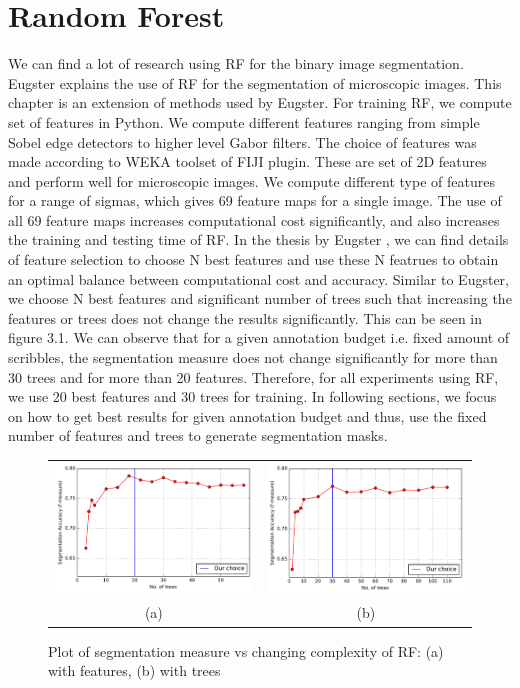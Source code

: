 \section{Random Forest}
We can find a lot of research using RF for the binary image segmentation. Eugster \cite{dominic} explains the use of RF for the segmentation of microscopic images. This chapter is an extension of methods used by Eugster. For training RF, we compute set of features in Python. We compute different features ranging from simple Sobel edge detectors to higher level Gabor filters. The choice of features was made according to WEKA \cite{weka} toolset of FIJI \cite{fiji} plugin. These are set of 2D features and perform well for microscopic images. We compute different type of features for a range of sigmas, which gives 69 feature maps for a single image. The use of all 69 feature maps increases computational cost significantly, and also increases the training and testing time of RF. In the thesis by Eugster \cite{dominic}, we can find details of feature selection to choose N best features and use these N featrues to obtain an optimal balance between computational cost and accuracy. Similar to Eugster, we choose N best features and significant number of trees such that increasing the features or trees does not change the results significantly. This can be seen in figure 3.1. We can observe that for a given annotation budget i.e. fixed amount of scribbles, the segmentation measure does not change significantly for more than 30 trees and for more than 20 features. Therefore, for all experiments using RF, we use 20 best features and 30 trees for training. In following sections, we focus on how to get best results for given annotation budget and thus, use the fixed number of features and trees to generate segmentation masks. 

\begin{figure}[h!] \label{fig:rf_complex}
\begin{tabular}{cc}
 \includegraphics[width=0.5\linewidth]{figures/diff_features.pdf} & \includegraphics[width=0.5\linewidth]{figures/diff_trees.pdf} \\
  (a)  & (b) \\
\end{tabular}
\caption{Plot of segmentation measure vs changing complexity of RF: (a) with features, (b) with trees}
\end{figure}

